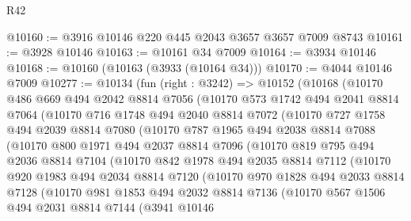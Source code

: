 \begin{lexlean}{R42}
\begin{coremodule}
@10160 := @3916 @10146 @220 @445 @2043 @3657 @3657 @7009 @8743
@10161 := @3928 @10146
@10163 := @10161 @34 @7009
@10164 := @3934 @10146
@10168 := @10160 (@10163 (@3933 (@10164 @34)))
@10170 := @4044 @10146 @7009
@10277 := @10134
    (fun (right : @3242) =>
    @10152
      (@10168
        (@10170
          @486
          @669
          @494
          @2042
          @8814
          @7056
          (@10170
            @573
            @1742
            @494
            @2041
            @8814
            @7064
            (@10170
              @716
              @1748
              @494
              @2040
              @8814
              @7072
              (@10170
                @727
                @1758
                @494
                @2039
                @8814
                @7080
                (@10170
                  @787
                  @1965
                  @494
                  @2038
                  @8814
                  @7088
                  (@10170
                    @800
                    @1971
                    @494
                    @2037
                    @8814
                    @7096
                    (@10170
                      @819
                      @795
                      @494
                      @2036
                      @8814
                      @7104
                      (@10170
                        @842
                        @1978
                        @494
                        @2035
                        @8814
                        @7112
                        (@10170
                          @920
                          @1983
                          @494
                          @2034
                          @8814
                          @7120
                          (@10170
                            @970
                            @1828
                            @494
                            @2033
                            @8814
                            @7128
                            (@10170
                              @981
                              @1853
                              @494
                              @2032
                              @8814
                              @7136
                              (@10170
                                @567
                                @1506
                                @494
                                @2031
                                @8814
                                @7144
                                (@3941
                                  @10146

\end{coremodule}
\end{lexlean}

